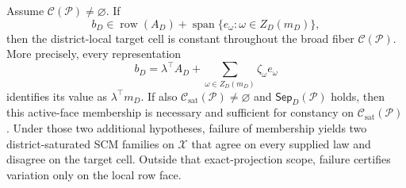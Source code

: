 Assume \(\mathcal C(\mathcal P)\ne\varnothing\). If
\[
b_D\in\operatorname{row}(A_D)+\operatorname{span}\{e_\omega:\omega\in Z_D(m_D)\},
\]
then the district-local target cell is constant throughout the broad fiber \(\mathcal C(\mathcal P)\). More precisely, every representation
\[
b_D=\lambda^\top A_D+\sum_{\omega\in Z_D(m_D)}\zeta_\omega e_\omega
\]
identifies its value as \(\lambda^\top m_D\). If also \(\mathcal C_{\mathrm{sat}}(\mathcal P)\ne\varnothing\) and \(\mathsf{Sep}_D(\mathcal P)\) holds, then this active-face membership is necessary and sufficient for constancy on \(\mathcal C_{\mathrm{sat}}(\mathcal P)\). Under those two additional hypotheses, failure of membership yields two district-saturated SCM families on \(\mathcal X\) that agree on every supplied law and disagree on the target cell. Outside that exact-projection scope, failure certifies variation only on the local row face.